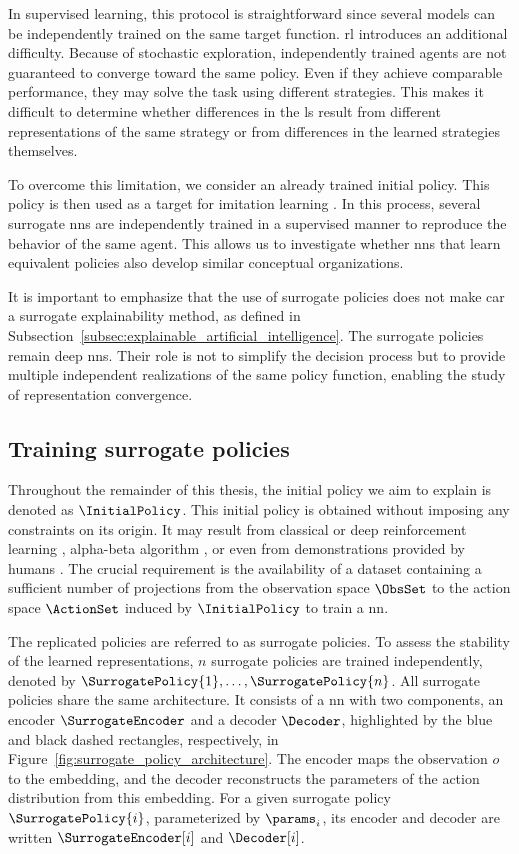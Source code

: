 In supervised learning, this protocol is straightforward since several models can be independently trained on the same target function.
\gls{rl} introduces an additional difficulty.
Because of stochastic exploration, independently trained agents are not guaranteed to converge toward the same policy.
Even if they achieve comparable performance, they may solve the task using different strategies.
This makes it difficult to determine whether differences in the \gls{ls} result from different representations of the same strategy or from differences in the learned strategies themselves.

To overcome this limitation, we consider an already trained initial policy.
This policy is then used as a target for imitation learning \parencite{pmlr-v15-ross11a}.
In this process, several surrogate \glspl{nn} are independently trained in a supervised manner to reproduce the behavior of the same agent.
This allows us to investigate whether \glspl{nn} that learn equivalent policies also develop similar conceptual organizations.

It is important to emphasize that the use of surrogate policies does not make \gls{car} a surrogate explainability method, as defined in Subsection~\ref{subsec:explainable_artificial_intelligence}.
The surrogate policies remain deep \glspl{nn}.
Their role is not to simplify the decision process but to provide multiple independent realizations of the same policy function, enabling the study of representation convergence.

\subsection{Training surrogate policies}

Throughout the remainder of this thesis, the initial policy we aim to explain is denoted as $\InitialPolicy$.
This initial policy is obtained without imposing any constraints on its origin.
It may result from classical or deep reinforcement learning \parencite{sutton2018reinforcement}, alpha-beta algorithm \parencite{knuth1975analysis}, or even from demonstrations provided by humans \parencite{pmlr-v9-ross10a}.
The crucial requirement is the availability of a dataset containing a sufficient number of projections from the observation space $\ObsSet$ to the action space $\ActionSet$ induced by $\InitialPolicy$ to train a \gls{nn}.

The replicated policies are referred to as surrogate policies.
To assess the stability of the learned representations, $n$ surrogate policies are trained independently, denoted by $\SurrogatePolicy{1}, \dots, \SurrogatePolicy{n}$.
All surrogate policies share the same architecture.
It consists of a \gls{nn} with two components, an encoder $\SurrogateEncoder$ and a decoder $\Decoder$, highlighted by the blue and black dashed rectangles, respectively, in Figure~\ref{fig:surrogate_policy_architecture}.
The encoder maps the observation $o$ to the embedding, and the decoder reconstructs the parameters of the action distribution from this embedding.
For a given surrogate policy $\SurrogatePolicy{i}$, parameterized by $\params_i$, its encoder and decoder are written $\SurrogateEncoder[i]$ and $\Decoder[i]$.


